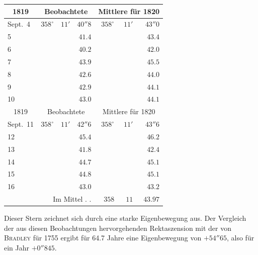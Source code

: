 \begin{center}
\begin{tabular}{l|rrr|rrr}
\multicolumn{1}{c|}{1819}  &  \multicolumn{3}{c|}{Beobachtete}  &  \multicolumn{3}{c}{Mittlere für 1820}  \\
\hline
Sept.\ 4  &  $358^\circ$  &  $11'$  &  $40''8$  &  $358^\circ$  &  $11'$  &  $43''0$  \\
5  &   &   &  $41.4$  &   &   &  $43.4$  \\
6  &   &   &  $40.2$  &   &   &  $42.0$  \\
7  &   &   &  $43.9$  &   &   &  $45.5$  \\
8  &   &   &  $42.6$  &   &   &  $44.0$  \\
9  &   &   &  $42.9$  &   &   &  $44.1$  \\
10  &   &   &  $43.0$  &   &   &  $44.1$  \\
\hline
 \multicolumn{1}{c|}{1819}  &  \multicolumn{3}{c|}{Beobachtete}  &  \multicolumn{3}{c}{Mittlere für 1820}  \\
\hline
 Sept.\ 11  &  $358^\circ$  &  $11'$  &  $42''6$  &  $358^\circ$  &  $11'$  &  $43''6$  \\
 12  &   &   &  $45.4$  &   &   &  $46.2$  \\
 13  &   &   &  $41.8$  &   &   &  $42.4$  \\
 14  &   &   &  $44.7$  &   &   &  $45.1$  \\
 15  &   &   &  $44.8$  &   &   &  $45.1$  \\
 16  &   &   &  $43.0$  &   &   &  $43.2$  \\
\multicolumn{4}{r|}{Im Mittel . .} &  $358$  &  $11$  &  $43.97$  \\
\end{tabular}
\end{center}

\par\indent Dieser Stern zeichnet sich durch eine starke Eigenbewegung aus. Der Vergleich der aus diesen Beobachtungen hervorgehenden Rektaszension mit der von \textsc{Bradley} für 1755 ergibt für 64.7 Jahre eine Eigenbewegung von $+54''65$, also für ein Jahr $+0''845$.
